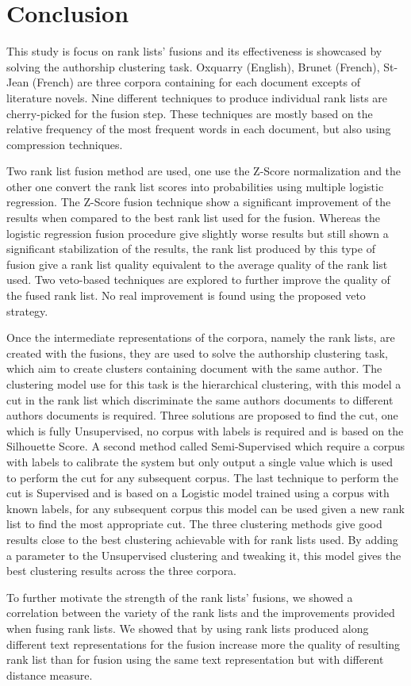 \section{Conclusion \label{sec:conclusion}}

This study is focus on rank lists' fusions and its effectiveness is showcased by solving the authorship clustering task.
Oxquarry (English), Brunet (French), St-Jean (French) are three corpora containing for each document excepts of literature novels.
Nine different techniques to produce individual rank lists are cherry-picked for the fusion step.
These techniques are mostly based on the relative frequency of the most frequent words in each document, but also using compression techniques.

Two rank list fusion method are used, one use the Z-Score normalization and the other one convert the rank list scores into probabilities using multiple logistic regression.
The Z-Score fusion technique show a significant improvement of the results when compared to the best rank list used for the fusion.
Whereas the logistic regression fusion procedure give slightly worse results but still shown a significant stabilization of the results, the rank list produced by this type of fusion give a rank list quality equivalent to the average quality of the rank list used.
Two veto-based techniques are explored to further improve the quality of the fused rank list.
No real improvement is found using the proposed veto strategy.

Once the intermediate representations of the corpora, namely the rank lists, are created with the fusions, they are used to solve the authorship clustering task, which aim to create clusters containing document with the same author.
The clustering model use for this task is the hierarchical clustering, with this model a cut in the rank list which discriminate the same authors documents to different authors documents is required.
Three solutions are proposed to find the cut, one which is fully Unsupervised, no corpus with labels is required and is based on the Silhouette Score.
A second method called Semi-Supervised which require a corpus with labels to calibrate the system but only output a single value which is used to perform the cut for any subsequent corpus.
The last technique to perform the cut is Supervised and is based on a Logistic model trained using a corpus with known labels, for any subsequent corpus this model can be used given a new rank list to find the most appropriate cut.
The three clustering methods give good results close to the best clustering achievable with for rank lists used.
By adding a parameter to the Unsupervised clustering and tweaking it, this model gives the best clustering results across the three corpora.

To further motivate the strength of the rank lists' fusions, we showed a correlation between the variety of the rank lists and the improvements provided when fusing rank lists.
We showed that by using rank lists produced along different text representations for the fusion increase more the quality of resulting rank list than for fusion using the same text representation but with different distance measure.
